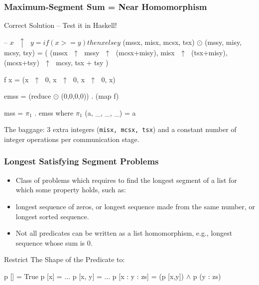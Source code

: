 \documentclass{beamer}
\renewcommand{\emph}[1]{\textcolor{structure}{#1}}
\newcommand{\emp}[1]{\textcolor{DikuRed}{ #1}}
\newcommand{\mymath}[1]{$ #1 $}
\newcommand{\myindx}[1]{_{#1}}
\begin{document}
\begin{frame}[fragile,t]
  \frametitle{Maximum-Segment Sum = Near Homomorphism}

\begin{block}{Correct Solution -- Test it in Haskell!}
\begin{colorcode}
-- \mymath{x\mbox{ }\uparrow\mbox{ }y = if(x >= y) then x else y}
(mssx, misx, mcsx, tsx) \mymath{\odot} (mssy, misy, mcsy, tsy) = (
        (mssx\mymath{\mbox{ }\uparrow\mbox{ }}mssy\mymath{\mbox{ }\uparrow\mbox{ }}(mcsx+misy),
         misx\mymath{\mbox{ }\uparrow\mbox{ }}(tsx+misy),
        (mcsx+tsy)\mymath{\mbox{ }\uparrow\mbox{ }}mcsy,
         tsx + tsy
    )

f x = (x\mymath{\mbox{ }\uparrow\mbox{ }}0, x\mymath{\mbox{ }\uparrow\mbox{ }}0, x\mymath{\mbox{ }\uparrow\mbox{ }}0, x)

\emph{emss = (reduce \mymath{\odot} (0,0,0,0)) . (map f)}

\emp{mss  = \mymath{\pi\myindx{1}} . emss}
       where \mymath{\pi\myindx{1}} (a, _, _, _) = a 
\end{colorcode}
\end{block} 

\smallskip

The baggage: $3$ extra integers ({\tt misx, mcsx, tsx}) 
and a constant number of integer operations per communication stage. 


\end{frame}


\begin{frame}[fragile,t]
  \frametitle{Longest Satisfying Segment Problems}

\begin{itemize}
    \item Class of problems which requires to find the longest segment of a list
            for which some property holds, such as:
    \item longest sequence of zeros, or longest sequence made from the same number, or longest sorted sequence.  
    \item Not all predicates can be written as a list homomorphism, e.g., longest sequence whose sum is 0.
\end{itemize}

\bigskip

\begin{block}{Restrict The Shape of the Predicate to:}
\begin{colorcode}
p []           = True
p [x]          = ...
p [x, y]       = ...
p [x : y : zs] = (p [x,y]) \mymath{\wedge} p (y : zs)
\end{colorcode}
\end{block} 

\end{frame}
\end{document}
